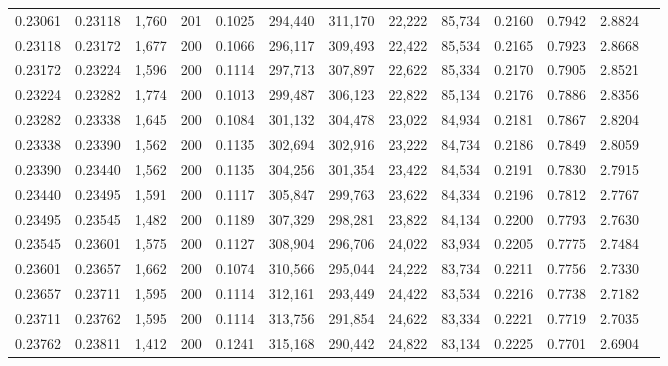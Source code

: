 \begin{tabular}{rrrrrrrrrrrrr}
0.23061 & 0.23118 & 1,760 & 201 &                                     0.1025 & 294,440 & 311,170 &  22,222 &  85,734 & 0.2160 & 0.7942 & 2.8824 \\
0.23118 & 0.23172 & 1,677 & 200 &                                     0.1066 & 296,117 & 309,493 &  22,422 &  85,534 & 0.2165 & 0.7923 & 2.8668 \\
0.23172 & 0.23224 & 1,596 & 200 &                                     0.1114 & 297,713 & 307,897 &  22,622 &  85,334 & 0.2170 & 0.7905 & 2.8521 \\
0.23224 & 0.23282 & 1,774 & 200 &                                     0.1013 & 299,487 & 306,123 &  22,822 &  85,134 & 0.2176 & 0.7886 & 2.8356 \\
0.23282 & 0.23338 & 1,645 & 200 &                                     0.1084 & 301,132 & 304,478 &  23,022 &  84,934 & 0.2181 & 0.7867 & 2.8204 \\
0.23338 & 0.23390 & 1,562 & 200 &                                     0.1135 & 302,694 & 302,916 &  23,222 &  84,734 & 0.2186 & 0.7849 & 2.8059 \\
0.23390 & 0.23440 & 1,562 & 200 &                                     0.1135 & 304,256 & 301,354 &  23,422 &  84,534 & 0.2191 & 0.7830 & 2.7915 \\
0.23440 & 0.23495 & 1,591 & 200 &                                     0.1117 & 305,847 & 299,763 &  23,622 &  84,334 & 0.2196 & 0.7812 & 2.7767 \\
0.23495 & 0.23545 & 1,482 & 200 &                                     0.1189 & 307,329 & 298,281 &  23,822 &  84,134 & 0.2200 & 0.7793 & 2.7630 \\
0.23545 & 0.23601 & 1,575 & 200 &                                     0.1127 & 308,904 & 296,706 &  24,022 &  83,934 & 0.2205 & 0.7775 & 2.7484 \\
0.23601 & 0.23657 & 1,662 & 200 &                                     0.1074 & 310,566 & 295,044 &  24,222 &  83,734 & 0.2211 & 0.7756 & 2.7330 \\
0.23657 & 0.23711 & 1,595 & 200 &                                     0.1114 & 312,161 & 293,449 &  24,422 &  83,534 & 0.2216 & 0.7738 & 2.7182 \\
0.23711 & 0.23762 & 1,595 & 200 &                                     0.1114 & 313,756 & 291,854 &  24,622 &  83,334 & 0.2221 & 0.7719 & 2.7035 \\
0.23762 & 0.23811 & 1,412 & 200 &                                     0.1241 & 315,168 & 290,442 &  24,822 &  83,134 & 0.2225 & 0.7701 & 2.6904 \\

\end{tabular}
